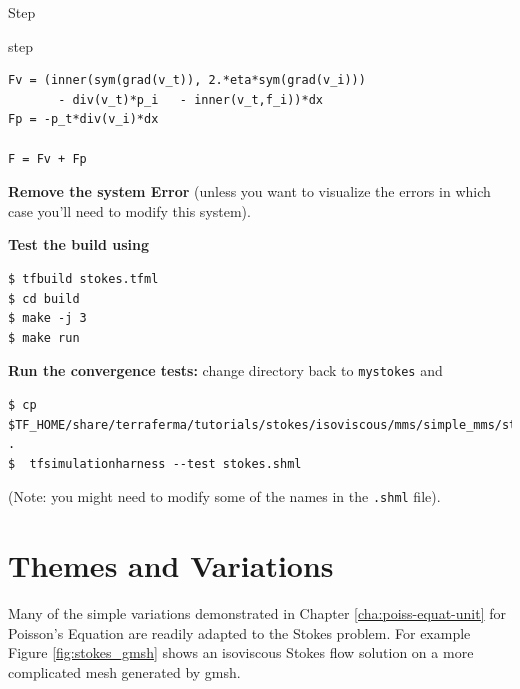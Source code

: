 \begin{steps}{Step}
\begin{steps}{step}
\begin{lstlisting}[style=UFL]
Fv = (inner(sym(grad(v_t)), 2.*eta*sym(grad(v_i))) 
       - div(v_t)*p_i   - inner(v_t,f_i))*dx
Fp = -p_t*div(v_i)*dx

F = Fv + Fp
    \end{lstlisting}

   \end{steps}
 \item \textbf{Remove the system Error} (unless you want to visualize
   the errors in which case you'll need to modify this system).
 \item \textbf{Test the build using}
   \begin{lstlisting}[style=Bash]
$ tfbuild stokes.tfml
$ cd build
$ make -j 3
$ make run
   \end{lstlisting}
 \item \textbf{Run the convergence tests:} change directory back to
   \texttt{mystokes} and
   \begin{lstlisting}[style=Bash]
$ cp $TF_HOME/share/terraferma/tutorials/stokes/isoviscous/mms/simple_mms/stokes.shml .
$  tfsimulationharness --test stokes.shml
\end{lstlisting} %
(Note: you might need to modify some of the names in the
\texttt{.shml} file).
\end{steps}


\section{Themes and Variations}
\label{sec:themes-variations}

Many of the simple variations demonstrated in Chapter
\ref{cha:poiss-equat-unit} for Poisson's Equation are readily adapted
to the Stokes problem.  For example Figure \ref{fig:stokes_gmsh} shows
an isoviscous Stokes flow solution on a more complicated mesh
generated by gmsh.


